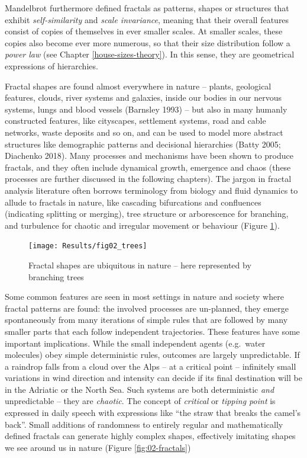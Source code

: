 \documentclass[
  12pt,
  a4paper, twoside]{book}
\begin{document}
Mandelbrot furthermore defined fractals as patterns, shapes or structures that exhibit \emph{self-similarity} and \emph{scale invariance}, meaning that their overall features consist of copies of themselves in ever smaller scales. At smaller scales, these copies also become ever more numerous, so that their size distribution follow a \emph{power law} (see Chapter \ref{house-sizes-theory}). In this sense, they are geometrical expressions of hierarchies.

Fractal shapes are found almost everywhere in nature -- plants, geological features, clouds, river systems and galaxies, inside our bodies in our nervous systems, lungs and blood vessels (Barnsley 1993) -- but also in many humanly constructed features, like cityscapes, settlement systems, road and cable networks, waste deposits and so on, and can be used to model more abstract structures like demographic patterns and decisional hierarchies (Batty 2005; Diachenko 2018). Many processes and mechanisms have been shown to produce fractals, and they often include dynamical growth, emergence and chaos (these processes are further discussed in the following chapters). The jargon in fractal analysis literature often borrows terminology from biology and fluid dynamics to allude to fractals in nature, like cascading bifurcations and confluences (indicating splitting or merging), tree structure or arborescence for branching, and turbulence for chaotic and irregular movement or behaviour (Figure \ref{fig:02-trees}).



\begin{figure}

{\centering \texttt{[image: Results/fig02\_trees]} 

}

\caption[Trees as example of fractal shapes in nature]{Fractal shapes are ubiquitous in nature -- here represented by branching trees}\label{fig:02-trees}
\end{figure}

Some common features are seen in most settings in nature and society where fractal patterns are found: the involved processes are un-planned, they emerge spontaneously from many iterations of simple rules that are followed by many smaller parts that each follow independent trajectories. These features have some important implications. While the small independent agents (e.g.~water molecules) obey simple deterministic rules, outcomes are largely unpredictable. If a raindrop falls from a cloud over the Alps -- at a critical point -- infinitely small variations in wind direction and intensity can decide if its final destination will be in the Adriatic or the North Sea. Such systems are both deterministic \emph{and} unpredictable -- they are \emph{chaotic}. The concept of \emph{critical} or \emph{tipping point} is expressed in daily speech with expressions like ``the straw that breaks the camel's back''. Small additions of randomness to entirely regular and mathematically defined fractals can generate highly complex shapes, effectively imitating shapes we see around us in nature (Figure \ref{fig:02-fractals})
\end{document}
